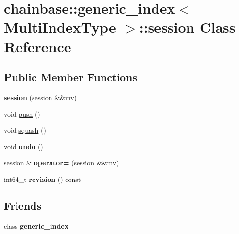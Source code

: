 \hypertarget{classchainbase_1_1generic__index_1_1session}{}\section{chainbase\+:\+:generic\+\_\+index$<$ Multi\+Index\+Type $>$\+:\+:session Class Reference}
\label{classchainbase_1_1generic__index_1_1session}
\subsection*{Public Member Functions}
\begin{DoxyCompactItemize}
\item 
\mbox{\label{classchainbase_1_1generic__index_1_1session_afdcceb22ca35fbb9894f89d4a9f98f43}} 
{\bfseries session} (\mbox{\hyperlink{classchainbase_1_1generic__index_1_1session}{session}} \&\&mv)
\item 
void \mbox{\hyperlink{classchainbase_1_1generic__index_1_1session_aa3b4c98efecade257b5d72e44fb79de0}{push}} ()
\item 
void \mbox{\hyperlink{classchainbase_1_1generic__index_1_1session_a0fd198ec07cc3313e51b30ae7699246c}{squash}} ()
\item 
\mbox{\label{classchainbase_1_1generic__index_1_1session_a75b494f130230f50f8097238bca83114}} 
void {\bfseries undo} ()
\item 
\mbox{\label{classchainbase_1_1generic__index_1_1session_a6b7436ec90a3ba92bf728341a2e75f0c}} 
\mbox{\hyperlink{classchainbase_1_1generic__index_1_1session}{session}} \& {\bfseries operator=} (\mbox{\hyperlink{classchainbase_1_1generic__index_1_1session}{session}} \&\&mv)
\item 
\mbox{\label{classchainbase_1_1generic__index_1_1session_a1fd8bd976ea91cd1b13ecd656982303d}} 
int64\+\_\+t {\bfseries revision} () const
\end{DoxyCompactItemize}
\subsection*{Friends}
\begin{DoxyCompactItemize}
\item 
\mbox{\label{classchainbase_1_1generic__index_1_1session_ac4f56c2a855b4a552fccbcc70dea4cb0}} 
class {\bfseries generic\+\_\+index}
\end{DoxyCompactItemize}


